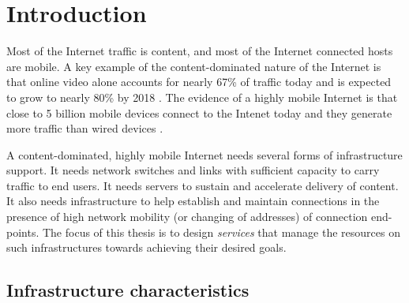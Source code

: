 \chapter{Introduction}

Most of the Internet traffic is content, and most of the Internet connected hosts are mobile. A key example of the content-dominated nature of the Internet is that online video alone accounts for nearly 67\% of traffic today and is expected to grow to nearly 80\% by 2018 \cite{cisco-videogrowth}. The evidence of a highly mobile Internet is that close to 5 billion mobile devices connect to the Intenet today and they generate more traffic than wired devices \cite{cisco-vni}.


A content-dominated, highly mobile Internet needs several forms of infrastructure support. It needs network switches and links with sufficient capacity to carry traffic to end users. It needs servers to sustain and accelerate delivery of content. It also needs  infrastructure to help establish and maintain connections in the presence of high network mobility (or changing of addresses) of connection end-points. The focus of this thesis is to design \emph{services} that manage the resources on such infrastructures towards achieving their desired goals.




\section{Infrastructure characteristics}

